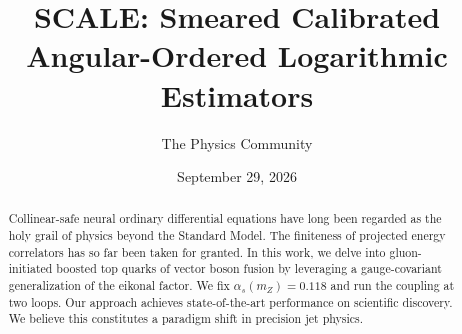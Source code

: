 \documentclass[11pt]{article}
\title{SCALE: Smeared Calibrated Angular-Ordered Logarithmic Estimators}
\author{The Physics Community}
\date{September 29, 2026}
\begin{document}
\maketitle
\begin{abstract}
Collinear-safe neural ordinary differential equations have long been
regarded as the holy grail of physics beyond the Standard Model. The
finiteness of projected energy correlators has so far been taken for
granted. In this work, we delve into gluon-initiated boosted top quarks
of vector boson fusion by leveraging a gauge-covariant generalization of
the eikonal factor. We fix $\alpha_s(m_Z) = 0.118$ and run the coupling
at two loops. Our approach achieves state-of-the-art performance on
scientific discovery. We believe this constitutes a paradigm shift in
precision jet physics.
\end{abstract}
\tableofcontents





\nocite{*}


\end{document}
